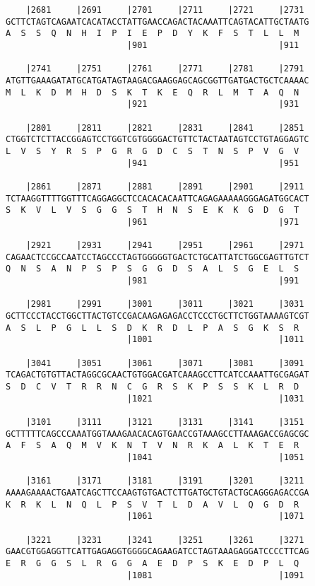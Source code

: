 \documentclass{article}
\begin{document}
\begin{Verbatim}
    |2681     |2691     |2701     |2711     |2721     |2731 
GCTTCTAGTCAGAATCACATACCTATTGAACCAGACTACAAATTCAGTACATTGCTAATG
A  S  S  Q  N  H  I  P  I  E  P  D  Y  K  F  S  T  L  L  M  
                        |901                          |911  
  
    |2741     |2751     |2761     |2771     |2781     |2791 
ATGTTGAAAGATATGCATGATAGTAAGACGAAGGAGCAGCGGTTGATGACTGCTCAAAAC
M  L  K  D  M  H  D  S  K  T  K  E  Q  R  L  M  T  A  Q  N  
                        |921                          |931  
  
    |2801     |2811     |2821     |2831     |2841     |2851 
CTGGTCTCTTACCGGAGTCCTGGTCGTGGGGACTGTTCTACTAATAGTCCTGTAGGAGTC
L  V  S  Y  R  S  P  G  R  G  D  C  S  T  N  S  P  V  G  V  
                        |941                          |951  
  
    |2861     |2871     |2881     |2891     |2901     |2911 
TCTAAGGTTTTGGTTTCAGGAGGCTCCACACACAATTCAGAGAAAAAGGGAGATGGCACT
S  K  V  L  V  S  G  G  S  T  H  N  S  E  K  K  G  D  G  T  
                        |961                          |971  
  
    |2921     |2931     |2941     |2951     |2961     |2971 
CAGAACTCCGCCAATCCTAGCCCTAGTGGGGGTGACTCTGCATTATCTGGCGAGTTGTCT
Q  N  S  A  N  P  S  P  S  G  G  D  S  A  L  S  G  E  L  S  
                        |981                          |991  
  
    |2981     |2991     |3001     |3011     |3021     |3031 
GCTTCCCTACCTGGCTTACTGTCCGACAAGAGAGACCTCCCTGCTTCTGGTAAAAGTCGT
A  S  L  P  G  L  L  S  D  K  R  D  L  P  A  S  G  K  S  R  
                        |1001                         |1011 
  
    |3041     |3051     |3061     |3071     |3081     |3091 
TCAGACTGTGTTACTAGGCGCAACTGTGGACGATCAAAGCCTTCATCCAAATTGCGAGAT
S  D  C  V  T  R  R  N  C  G  R  S  K  P  S  S  K  L  R  D  
                        |1021                         |1031 
  
    |3101     |3111     |3121     |3131     |3141     |3151 
GCTTTTTCAGCCCAAATGGTAAAGAACACAGTGAACCGTAAAGCCTTAAAGACCGAGCGC
A  F  S  A  Q  M  V  K  N  T  V  N  R  K  A  L  K  T  E  R  
                        |1041                         |1051 
  
    |3161     |3171     |3181     |3191     |3201     |3211 
AAAAGAAAACTGAATCAGCTTCCAAGTGTGACTCTTGATGCTGTACTGCAGGGAGACCGA
K  R  K  L  N  Q  L  P  S  V  T  L  D  A  V  L  Q  G  D  R  
                        |1061                         |1071 
  
    |3221     |3231     |3241     |3251     |3261     |3271 
GAACGTGGAGGTTCATTGAGAGGTGGGGCAGAAGATCCTAGTAAAGAGGATCCCCTTCAG
E  R  G  G  S  L  R  G  G  A  E  D  P  S  K  E  D  P  L  Q  
                        |1081                         |1091 
  

\end{Verbatim}
\end{document}
